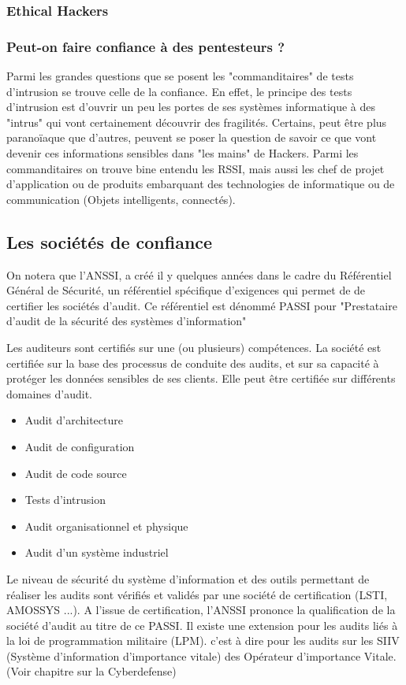 \subsubsection{ Ethical Hackers}


\subsubsection{Peut-on faire confiance à des pentesteurs ?}
Parmi les grandes questions que se posent les "commanditaires" de tests d'intrusion se trouve celle de la confiance.
En effet, le principe des tests d'intrusion est d'ouvrir un peu les portes de ses systèmes informatique à des "intrus" qui vont certainement découvrir des fragilités.
Certains, peut être plus paranoïaque que d'autres, peuvent se poser la question de savoir ce que vont devenir ces informations sensibles dans "les mains" de Hackers.
Parmi les commanditaires on trouve bine entendu les RSSI, mais aussi les chef de projet d'application ou de produits embarquant des technologies de informatique ou de communication (Objets intelligents, connectés).

\subsection{Les sociétés de confiance}
On notera que l'ANSSI, a créé il y quelques années dans le cadre du Référentiel Général de Sécurité, un référentiel spécifique d'exigences qui permet de de certifier les sociétés d'audit. Ce référentiel est dénommé PASSI  pour "Prestataire d’audit de la sécurité des systèmes d’information"

Les auditeurs sont certifiés sur une (ou plusieurs) compétences.
La société est certifiée sur la base des processus de conduite des audits, et sur sa capacité à protéger les données sensibles de ses clients. Elle peut être certifiée sur différents domaines d'audit.

\begin{itemize}
    \item Audit d'architecture
    \item Audit de configuration
    \item Audit de code source
    \item Tests d'intrusion
    \item Audit organisationnel et physique
    \item Audit d'un système industriel
\end{itemize}

Le niveau de sécurité du système d'information et des  outils permettant de réaliser les audits sont vérifiés et validés par une société de certification (LSTI, AMOSSYS ...). A l'issue de certification, l'ANSSI prononce la qualification de la société d'audit au titre de ce PASSI. Il existe une extension pour les audits liés à la loi de programmation militaire (LPM). c'est à dire pour les audits sur les SIIV (Système d'information d'importance vitale) des Opérateur d'importance Vitale. (Voir chapitre sur la Cyberdefense)

